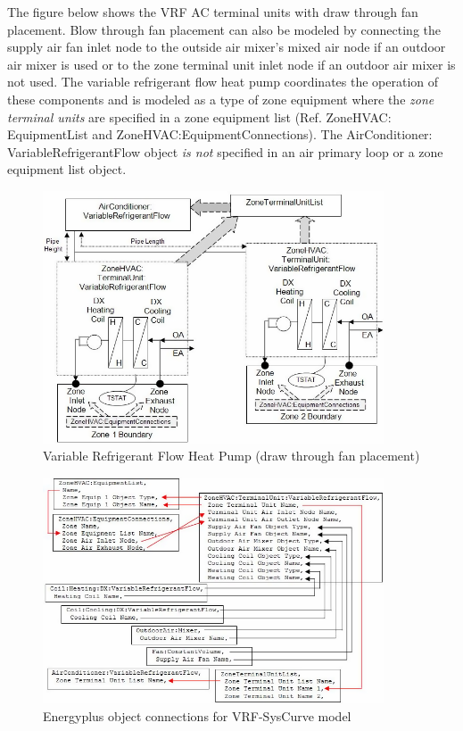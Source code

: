 The figure below shows the VRF AC terminal units with draw through fan placement. Blow through fan placement can also be modeled by connecting the supply air fan inlet node to the outside air mixer's mixed air node if an outdoor air mixer is used or to the zone terminal unit inlet node if an outdoor air mixer is not used. The variable refrigerant flow heat pump coordinates the operation of these components and is modeled as a type of zone equipment where the \emph{zone terminal units} are specified in a zone equipment list (Ref. ZoneHVAC: EquipmentList and ZoneHVAC:EquipmentConnections). The AirConditioner: VariableRefrigerantFlow object \emph{is not} specified in an air primary loop or a zone equipment list object.

\begin{figure}[hbtp] %
\centering
\includegraphics[width=0.9\textwidth, height=0.9\textheight, keepaspectratio=true]{media/image5315.png}
\caption{Variable Refrigerant Flow Heat Pump (draw through fan placement) \protect \label{fig:variable-refrigerant-flow-heat-pump-draw}}
\end{figure}

\begin{figure}[hbtp] %
\centering
\includegraphics[width=0.9\textwidth, height=0.9\textheight, keepaspectratio=true]{media/image5316.png}
\caption{Energyplus object connections for VRF-SysCurve model \protect \label{fig:energyplus-object-connections-for-vrf}}
\end{figure}

